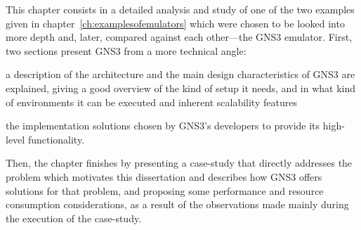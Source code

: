 

This chapter consists in a detailed analysis and study of one of the two examples given in chapter~\ref{ch:examplesofemulators} which were chosen to be looked into more depth and, later, compared against each other---the GNS3 emulator.
First, two sections present GNS3 from a more technical angle:
  \begin{enumerate*}[label=(\roman*), itemjoin={{, }}, itemjoin*={{, and }}]
  \item a description of the architecture and the main design characteristics of GNS3 are explained, giving a good overview of the kind of setup it needs, and in what kind of environments it can be executed and inherent scalability features
  \item the implementation solutions chosen by GNS3's developers to provide its high-level functionality.
  \end{enumerate*}
Then, the chapter finishes by presenting a case-study that directly addresses the problem which motivates this dissertation and describes how GNS3 offers solutions for that problem, and proposing some performance and resource consumption considerations, as a result of the observations made mainly during the execution of the case-study.







